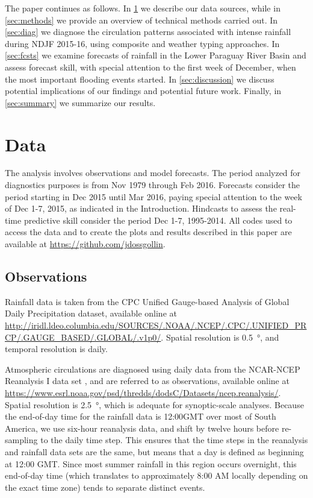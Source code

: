 \documentclass[twocol]{ametsoc}
\begin{document}
The paper continues as follows.
In \cref{sec:data} we describe our data sources, while in \cref{sec:methods} we provide an overview of technical methods carried out.
In \cref{sec:diag} we diagnose the circulation patterns associated with intense rainfall during NDJF 2015-16, using composite and weather typing approaches.
In \cref{sec:fcsts} we examine forecasts of rainfall in the Lower Paraguay River Basin and assess forecast skill, with special attention to the first week of December, when the most important flooding events started.
In \cref{sec:discussion} we discuss potential implications of our findings and potential future work.
Finally, in \cref{sec:summary} we summarize our results.


\section{Data} \label{sec:data}

The analysis involves observations and model forecasts. The period analyzed for diagnostics purposes is from Nov 1979 through Feb 2016. Forecasts consider the period starting in Dec 2015 until Mar 2016, paying special attention to the week of Dec 1-7, 2015, as indicated in the Introduction. Hindcasts to assess the real-time predictive skill consider the period Dec 1-7, 1995-2014. All codes used to access the data and to create the plots and results described in this paper are available at \url{https://github.com/jdossgollin}.


\subsection{Observations}
Rainfall data is taken from the CPC Unified Gauge-based Analysis of Global Daily Precipitation dataset, available online at \url{http://iridl.ldeo.columbia.edu/SOURCES/.NOAA/.NCEP/.CPC/.UNIFIED_PRCP/.GAUGE_BASED/.GLOBAL/.v1p0/}.
Spatial resolution is \SI{0.5}{\degree}, and temporal resolution is daily.

Atmospheric circulations are diagnosed using daily data from the NCAR-NCEP Reanalysis I data set \citep{Kalnay1996}, and are referred to as observations, available online at \url{https://www.esrl.noaa.gov/psd/thredds/dodsC/Datasets/ncep.reanalysis/}.
Spatial resolution is \SI{2.5}{\degree}, which is adequate for synoptic-scale analyses.
Because the end-of-day time for the rainfall data is 12:00GMT over most of South America, we use six-hour reanalysis data, and shift by twelve hours before re-sampling to the daily time step.
This ensures that the time steps in the reanalysis and rainfall data sets are the same, but means that a day is defined as beginning at 12:00 GMT.
Since most summer rainfall in this region occurs overnight, this end-of-day time (which translates to approximately 8:00 AM locally depending on the exact time zone) tends to separate distinct events.
\end{document}
